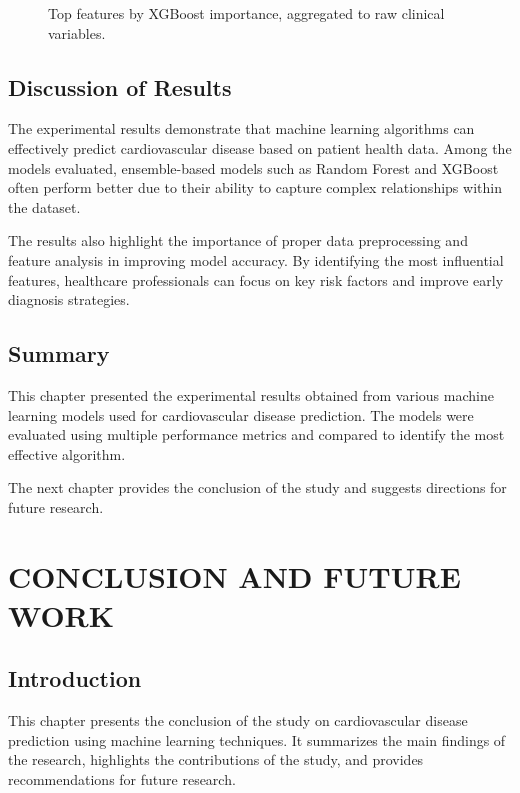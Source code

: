 \begin{figure}[htbp]
\centering

\caption{Top features by XGBoost importance, aggregated to raw clinical variables.}
\label{fig:feature_importance_xgb}
\end{figure}

\section{Discussion of Results}

The experimental results demonstrate that machine learning algorithms can effectively predict cardiovascular disease based on patient health data. Among the models evaluated, ensemble-based models such as Random Forest and XGBoost often perform better due to their ability to capture complex relationships within the dataset.

The results also highlight the importance of proper data preprocessing and feature analysis in improving model accuracy. By identifying the most influential features, healthcare professionals can focus on key risk factors and improve early diagnosis strategies.

\section{Summary}

This chapter presented the experimental results obtained from various machine learning models used for cardiovascular disease prediction. The models were evaluated using multiple performance metrics and compared to identify the most effective algorithm.

The next chapter provides the conclusion of the study and suggests directions for future research.

\chapter{CONCLUSION AND FUTURE WORK}

\section{Introduction}

This chapter presents the conclusion of the study on cardiovascular disease prediction using machine learning techniques. It summarizes the main findings of the research, highlights the contributions of the study, and provides recommendations for future research.

